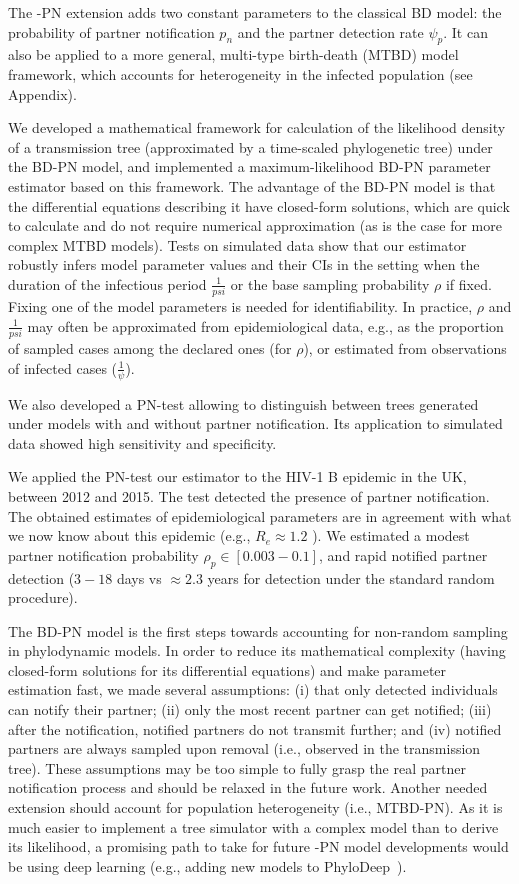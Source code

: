 \documentclass[a4paper,10pt]{article}
\begin{document}
The -PN extension adds two constant parameters to the classical BD model: the probability of partner notification $p_n$ and the partner detection rate $\psi_p$. It can also be applied to a more general, multi-type birth-death (MTBD) model framework, which accounts for heterogeneity in the infected population (see Appendix). 

We developed a mathematical framework for calculation of the likelihood density of a transmission tree (approximated by a time-scaled phylogenetic tree) under the BD-PN model, and implemented a maximum-likelihood BD-PN parameter estimator based on this framework. The advantage of the BD-PN model is that the differential equations describing it have closed-form solutions, which are quick to calculate and do not require numerical approximation (as is the case for more complex MTBD models). Tests on simulated data show that our estimator robustly infers model parameter values and their CIs in the setting when the duration of the infectious period $\frac{1}{psi}$ or the base sampling probability $\rho$ if fixed. Fixing one of the model parameters is needed for identifiability. In practice, $\rho$ and $\frac{1}{psi}$ may often be approximated from epidemiological data, e.g., as the proportion of sampled cases among the declared ones (for $\rho$), or estimated from observations of infected cases ($\frac{1}{\psi}$). 

We also developed a PN-test allowing to distinguish between trees generated under models with and without partner notification. Its application to simulated data showed high sensitivity and specificity. 

We applied the PN-test our estimator to the HIV-1 B epidemic in the UK, between 2012 and 2015. The test detected the presence of partner notification. The obtained estimates of epidemiological parameters are in agreement with what we now know about this epidemic (e.g., $R_e \approx 1.2$ ). We estimated a modest partner notification probability $\rho_p \in [0.003-0.1]$, and rapid notified partner detection ($3-18$ days vs $\approx2.3$ years for detection under the standard random procedure).

The BD-PN model is the first steps towards accounting for non-random sampling in phylodynamic models. In order to reduce its mathematical complexity (having closed-form solutions for its differential equations) and make parameter estimation fast, we made several assumptions: (i) that only detected individuals can notify their partner; (ii) only the most recent partner can get notified; (iii) after the notification, notified partners do not transmit further; and (iv) notified partners are always sampled upon removal (i.e., observed in the transmission tree). These assumptions may be too simple to fully grasp the real partner notification process and should be relaxed in the future work. Another needed extension should account for population heterogeneity (i.e., MTBD-PN). As it is much easier to implement a tree simulator with a complex model than to derive its likelihood, a promising path to take for future -PN model developments would be using deep learning (e.g., adding new models to PhyloDeep~\citep{Voznica2021}). 
\end{document}
